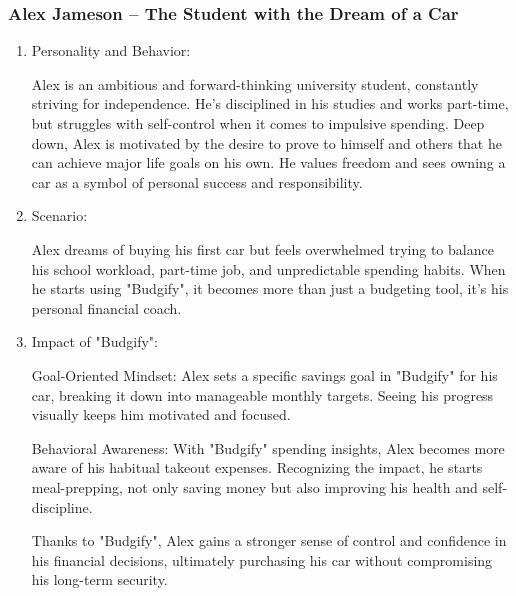 \documentclass[a4paper,12pt]{article}
\begin{document}
\subsubsection{Alex Jameson – The Student with the Dream of a Car}
\begin{enumerate}
    \item Personality and Behavior:
    
    Alex is an ambitious and forward-thinking university student, constantly striving for independence. He's disciplined in his studies and works part-time, but struggles with self-control when it comes to impulsive spending. Deep down, Alex is motivated by the desire to prove to himself and others that he can achieve major life goals on his own. He values freedom and sees owning a car as a symbol of personal success and responsibility.
    
    \item Scenario:
    
    Alex dreams of buying his first car but feels overwhelmed trying to balance his school workload, part-time job, and unpredictable spending habits. When he starts using "Budgify", it becomes more than just a budgeting tool, it’s his personal financial coach.
    
    \item Impact of "Budgify":
    
    Goal-Oriented Mindset: Alex sets a specific savings goal in "Budgify" for his car, breaking it down into manageable monthly targets. Seeing his progress visually keeps him motivated and focused.
    
    Behavioral Awareness: With "Budgify" spending insights, Alex becomes more aware of his habitual takeout expenses. Recognizing the impact, he starts meal-prepping, not only saving money but also improving his health and self-discipline.
    
    Thanks to "Budgify", Alex gains a stronger sense of control and confidence in his financial decisions, ultimately purchasing his car without compromising his long-term security.

\end{enumerate}
\end{document}
